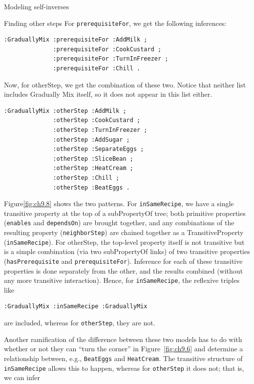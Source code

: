 \begin{challenge}{Modeling self-inverses}
\begin{challenge}{Finding other steps}
For \texttt{prerequisiteFor}, we get the following inferences:

\begin{lstlisting}
:GraduallyMix :prerequisiteFor :AddMilk ;
              :prerequisiteFor :CookCustard ;
              :prerequisiteFor :TurnInFreezer ;
              :prerequisiteFor :Chill .
\end{lstlisting}

Now, for otherStep, we get the combination of these two. Notice that
neither list includes Gradually
Mix itself, so it does not appear in this list either.

\begin{lstlisting}
:GraduallyMix :otherStep :AddMilk ;
              :otherStep :CookCustard ;
              :otherStep :TurnInFreezer ;
              :otherStep :AddSugar ;
              :otherStep :SeparateEggs ;
              :otherStep :SliceBean ;
              :otherStep :HeatCream ;
              :otherStep :Chill ;
              :otherStep :BeatEggs .
\end{lstlisting}

Figure\ref{fig:ch9.8} shows the two patterns. For \texttt{inSameRecipe}, we have a single
transitive property at the top of a subPropertyOf tree; both primitive
properties (\texttt{enables} and \texttt{dependsOn}) are brought together, and any
combinations of the resulting property (\texttt{neighborStep}) are chained
together as a TransitiveProperty (\texttt{inSameRecipe}). For otherStep, the
top-level property itself is not transitive but is a simple combination
(via two subPropertyOf links) of two transitive properties
(\texttt{hasPrerequisite} and \texttt{prerequisiteFor}). Inference for each of these
transitive properties is done separately from the other, and the results
combined (without any more transitive interaction). Hence, for
\texttt{inSameRecipe}, the reflexive triples like

\begin{lstlisting}
:GraduallyMix :inSameRecipe :GraduallyMix
\end{lstlisting}

are included, whereas for \texttt{otherStep}, they are not.

Another ramification of the difference between these two models has to
do with whether or not they can ``turn the corner'' in Figure~\ref{fig:ch9.6} and
determine a relationship between, e.g., \texttt{BeatEggs} and \texttt{HeatCream}. The
transitive structure of \texttt{inSameRecipe} allows this to happen, whereas for
\texttt{otherStep} it does not; that is, we can infer


\end{challenge}
\end{challenge}
